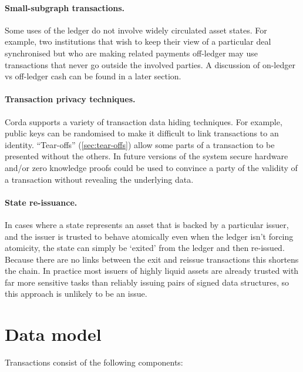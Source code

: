 \documentclass{article}
\begin{document}
\paragraph{Small-subgraph transactions.}Some uses of the ledger do not involve widely circulated asset states.
For example, two institutions that wish to keep their view of a particular deal synchronised but who are making
related payments off-ledger may use transactions that never go outside the involved parties. A discussion of
on-ledger vs off-ledger cash can be found in a later section.

\paragraph{Transaction privacy techniques.}Corda supports a variety of transaction data hiding techniques. For
example, public keys can be randomised to make it difficult to link transactions to an identity. ``Tear-offs'' (\cref{sec:tear-offs})
allow some parts of a transaction to be presented without the others. In future versions of the system secure hardware
and/or zero knowledge proofs could be used to convince a party of the validity of a transaction without revealing the
underlying data.

\paragraph{State re-issuance.}In cases where a state represents an asset that is backed by a particular issuer,
and the issuer is trusted to behave atomically even when the ledger isn't forcing atomicity, the state can
simply be `exited' from the ledger and then re-issued. Because there are no links between the exit and reissue
transactions this shortens the chain. In practice most issuers of highly liquid assets are already trusted with
far more sensitive tasks than reliably issuing pairs of signed data structures, so this approach is unlikely to
be an issue.

\section{Data model}

Transactions consist of the following components:
\end{document}
